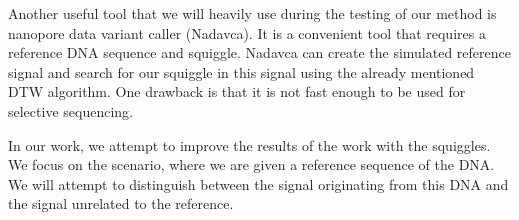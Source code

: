 Another useful tool that we will heavily use during the testing of our method is
nanopore data variant caller (Nadavca). It is a convenient tool that requires a reference
DNA sequence and squiggle. Nadavca can create the simulated reference signal
and search for our squiggle in this signal using the already mentioned DTW algorithm.
One drawback is that it is not fast enough to be used for selective sequencing.

In our work, we attempt to improve the results of the work with the squiggles.
We focus on the scenario, where we are given a reference sequence of the DNA. We
will attempt to distinguish between the signal originating from this DNA and the
signal unrelated to the reference.
